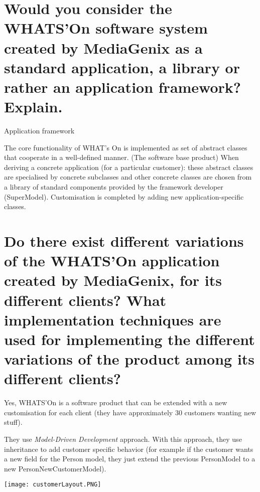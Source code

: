 \section{Would you consider the WHATS'On software system created by MediaGenix as a
standard application, a library or rather an application framework? Explain.}

Application framework

The core functionality of WHAT's On is implemented as set of abstract classes that cooperate in a well-defined manner. (The software base product)
When deriving a concrete application (for a particular customer): these abstract classes are specialised by concrete subclasses and
other concrete classes are chosen from a library of standard 
components provided by the framework developer (SuperModel). 
Customisation is completed by adding new application-specific classes.



\section{Do there exist different variations of the WHATS’On application created by MediaGenix,
for its different clients?
What implementation techniques are used for implementing the different variations of
the product among its different clients?}
Yes, WHATS'On is a software product that can be extended with a new customisation for each client (they have approximately 30 customers wanting new stuff).

They use \textit{Model-Driven Development} approach.
With this approach, they use inheritance to add customer specific behavior (for example if the customer wants a new field for the Person model, they just extend the previous PersonModel to a new PersonNewCustomerModel). 
\begin{center}
\texttt{[image: customerLayout.PNG]}
\end{center}


